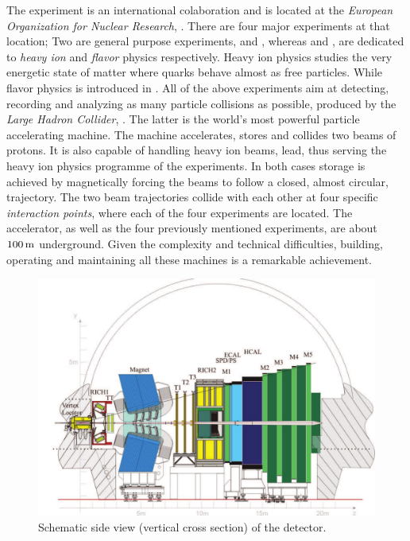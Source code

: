 
The \lhcb experiment is an international colaboration and is located at the {\it European Organization for Nuclear Research}, \cern.
There are four major experiments at that location; Two are general purpose experiments, \atlas and \cms, whereas
\alice and \lhcb, are dedicated to {\it heavy ion} and {\it flavor} physics respectively. Heavy ion physics
studies the very energetic state of matter where quarks behave almost as free particles.
While flavor physics is introduced in . All of the above experiments aim at detecting,
recording and analyzing as many particle collisions as possible, produced by the {\it Large Hadron Collider}, \lhc.
The latter is the world's most powerful particle accelerating machine.
The \lhc machine accelerates, stores and collides two beams of protons. It is also capable of handling
heavy ion beams, \eg lead, thus serving the heavy ion physics programme of the experiments.
In both cases storage is achieved by magnetically forcing the beams to follow a closed, almost circular,
trajectory. The two beam trajectories collide with each other at four specific {\it interaction points},
where each of the four experiments are located. The \lhc accelerator, as well as the four previously
mentioned experiments, are about $100\rm \,m$ underground. Given the complexity and technical difficulties,
building, operating and maintaining all these machines is a remarkable achievement.

\begin{figure}[t]
  \centering
  \includegraphics[width=1\textwidth]{Figures/Chapter2/detector_cross_cmyk}
  \caption{Schematic side view (vertical cross section) of the \lhcb detector.}
  \label{lhcb_detector_cross_section}
\end{figure}

